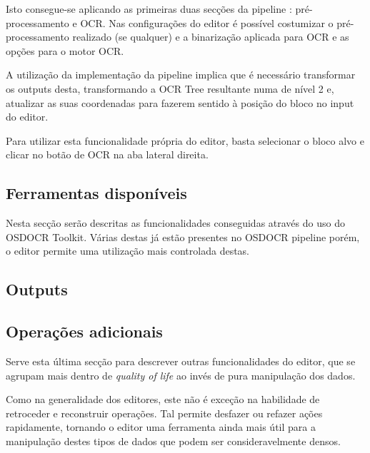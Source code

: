 Isto consegue-se aplicando as primeiras duas secções da pipeline : pré-processamento e OCR. Nas configurações do editor é possível costumizar o pré-processamento realizado (se qualquer) e a binarização aplicada para OCR e as opções para o motor OCR.

A utilização da implementação da pipeline implica que é necessário transformar os outputs desta, transformando a OCR Tree resultante numa de nível 2 e, atualizar as suas coordenadas para fazerem sentido à posição do bloco no input do editor.

Para utilizar esta funcionalidade própria do editor, basta selecionar o bloco alvo e clicar no botão de OCR na aba lateral direita.




\subsection{Ferramentas disponíveis}

Nesta secção serão descritas as funcionalidades conseguidas através do uso do OSDOCR Toolkit. Várias destas já estão presentes no OSDOCR pipeline porém, o editor permite uma utilização mais controlada destas.






\subsection{Outputs}

\subsection{Operações adicionais}

Serve esta última secção para descrever outras funcionalidades do editor, que se agrupam mais dentro de \textit{quality of life} ao invés de pura manipulação dos dados.


Como na generalidade dos editores, este não é exceção na habilidade de retroceder e reconstruir operações. Tal permite desfazer ou refazer ações rapidamente, tornando o editor uma ferramenta ainda mais útil para a manipulação destes tipos de dados que podem ser consideravelmente densos.

